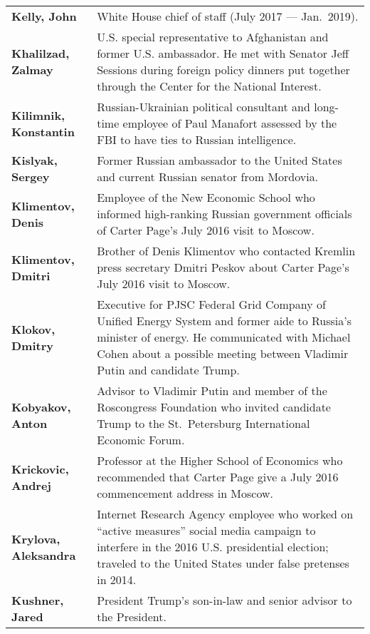 \begin{longtable}{ p{} p{} }
    \textbf{Kelly, John} & White House chief of staff (July 2017 — Jan.~2019). \\

    \textbf{Khalilzad, Zalmay} & U.S. special representative to Afghanistan and former U.S. ambassador. He met with Senator Jeff Sessions during foreign policy dinners put together through the Center for the National Interest. \\

    \textbf{Kilimnik, Konstantin} & Russian-Ukrainian political consultant and long-time employee of Paul Manafort assessed by the FBI to have ties to Russian intelligence. \\

    \textbf{Kislyak, Sergey} & Former Russian ambassador to the United States and current Russian senator from Mordovia. \\

    \textbf{Klimentov, Denis} & Employee of the New Economic School who informed high-ranking Russian government officials of Carter Page's July 2016 visit to Moscow. \\

    \textbf{Klimentov, Dmitri} & Brother of Denis Klimentov who contacted Kremlin press secretary Dmitri Peskov about Carter Page's July 2016 visit to Moscow. \\

    \textbf{Klokov, Dmitry} & Executive for PJSC Federal Grid Company of Unified Energy System and former aide to Russia's minister of energy. He communicated with Michael Cohen about a possible meeting between Vladimir Putin and candidate Trump. \\

    \textbf{Kobyakov, Anton} & Advisor to Vladimir Putin and member of the Roscongress Foundation who invited candidate Trump to the St.~Petersburg International Economic Forum. \\

    \textbf{Krickovic, Andrej} & Professor at the Higher School of Economics who recommended that Carter Page give a July 2016 commencement address in Moscow. \\

    \textbf{Krylova, Aleksandra} & Internet Research Agency employee who worked on ``active measures'' social media campaign to interfere in the 2016 U.S. presidential election; traveled to the United States under false pretenses in 2014. \\

    \textbf{Kushner, Jared} & President Trump's son-in-law and senior advisor to the President. \\


\end{longtable}
